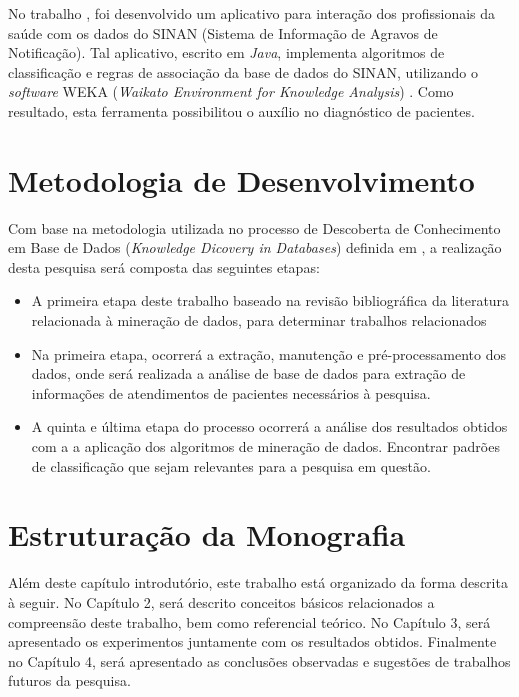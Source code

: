 \documentclass[
	12pt,				%
	openright,			%
	oneside,	
	a4paper,				%
	english,				%
	brazil				%
]{abntex2/abntex2} %
\begin{document}
	No trabalho \cite{santos:2011}, foi desenvolvido um aplicativo para interação dos profissionais da saúde com os dados do SINAN (Sistema de Informação de Agravos de Notificação). Tal aplicativo, escrito em  \textit{Java}\cite{oracle:2015}, implementa algoritmos de classificação e regras de associação da base de dados do SINAN, utilizando o \textit{software} WEKA (\textit{Waikato Environment for Knowledge Analysis}) \cite{weka:2015}. Como resultado, esta ferramenta possibilitou o auxílio no diagnóstico de pacientes.	

	\section{Metodologia de Desenvolvimento}
		
		Com base na metodologia utilizada no processo de Descoberta de Conhecimento em Base de Dados (\textit{Knowledge Dicovery in Databases}) definida em \cite{fayyad:1996}, a realização desta pesquisa será composta das seguintes etapas:
		
		\begin{itemize}
			
			\item A primeira etapa deste trabalho baseado na revisão bibliográfica da literatura relacionada à mineração de dados, para determinar trabalhos relacionados
			
			\item Na primeira etapa, ocorrerá a extração, manutenção e pré-processamento dos dados, onde será realizada a análise de base de dados para extração de informações de atendimentos de pacientes necessários à pesquisa. 
			
			\item A quinta e última etapa do processo ocorrerá a análise dos resultados obtidos com a a aplicação dos algoritmos de mineração de dados. Encontrar padrões de classificação que sejam relevantes para a pesquisa em questão.
			
		\end{itemize}
	
	\section{Estruturação da Monografia}
	
		Além deste capítulo introdutório, este trabalho está organizado da forma descrita à seguir. No Capítulo 2, será descrito conceitos básicos relacionados a compreensão deste trabalho, bem como referencial teórico. No Capítulo 3, será apresentado os experimentos juntamente com os resultados obtidos. Finalmente no Capítulo 4, será apresentado as conclusões observadas e sugestões de trabalhos futuros da pesquisa.
\end{document}
